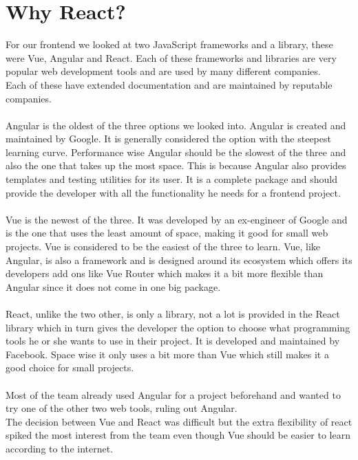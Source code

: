\section{Why React?}
For our frontend we looked at two JavaScript frameworks and a library, these were Vue, Angular and React.
Each of these frameworks and libraries are very popular web development tools and are used by many different companies\cite{VueReactAngular}.
\\
Each of these have extended documentation and are maintained by reputable companies.
\\\\
Angular is the oldest of the three options we looked into. 
Angular is created and maintained by Google.
It is generally considered the option with the steepest learning curve.
Performance wise Angular should be the slowest of the three and also the one that takes up the most space.
This is because Angular also provides templates and testing utilities for its user.
It is a complete package and should provide the developer with all the functionality he needs for a frontend project.
\\\\
Vue is the newest of the three. 
It was developed by an ex-engineer of Google and is the one that uses the least amount of space, making it good for small web projects.
Vue is considered to be the easiest of the three to learn.
Vue, like Angular, is also a framework and is designed around its ecosystem which offers its developers add ons like Vue Router which makes it a bit more flexible than Angular since it does not come in one big package.
\\\\
React, unlike the two other, is only a library, not a lot is provided in the React library which in turn gives the developer the option to choose what programming tools he or she wants to use in their project.
It is developed and maintained by Facebook.
Space wise it only uses a bit more than Vue which still makes it a good choice for small projects.
\\\\
Most of the team already used Angular for a project beforehand and wanted to try one of the other two web tools, ruling out Angular. 
\\
The decision between Vue and React was difficult but the extra flexibility of react spiked the most interest from the team even though Vue should be easier to learn according to the internet.

